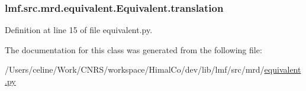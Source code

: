 \hypertarget{classlmf_1_1src_1_1mrd_1_1equivalent_1_1_equivalent_a77291abfc219bae6b51d8994d3c844a2}{
\subsubsection[{translation}]{\setlength{\rightskip}{0pt plus 5cm}lmf.\+src.\+mrd.\+equivalent.\+Equivalent.\+translation}}\label{classlmf_1_1src_1_1mrd_1_1equivalent_1_1_equivalent_a77291abfc219bae6b51d8994d3c844a2}


Definition at line 15 of file equivalent.\+py.



The documentation for this class was generated from the following file\+:\begin{DoxyCompactItemize}
\item 
/\+Users/celine/\+Work/\+C\+N\+R\+S/workspace/\+Himal\+Co/dev/lib/lmf/src/mrd/\hyperlink{equivalent_8py}{equivalent.\+py}\end{DoxyCompactItemize}
